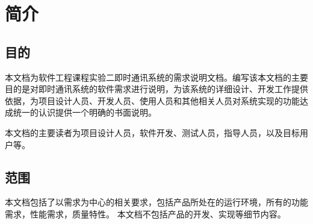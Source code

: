 \chapter{简介}
\section{目的}


本文档为软件工程课程实验二即时通讯系统的需求说明文档。编写该本文档的主要目的是对即时通讯系统的软件需求进行说明，为该系统的详细设计、开发工作提供依据，为项目设计人员、开发人员、使用人员和其他相关人员对系统实现的功能达成统一的认识提供一个明确的书面说明。

本文档的主要读者为项目设计人员，软件开发、测试人员，指导人员，以及目标用户等。

\section{范围}

本文档包括了以需求为中心的相关要求，包括产品所处在的运行环境，所有的功能需求，性能需求，质量特性。
\linebreak
本文档不包括产品的开发、实现等细节内容。
